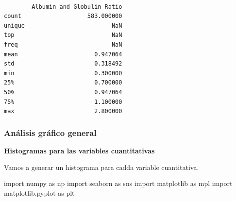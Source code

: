 \documentclass[
  11pt,
  a4paper,
]{article}
\newenvironment{Shaded}{\begin{snugshade}}{\end{snugshade}}
\newcommand{\ImportTok}[1]{#1}
\newcommand{\NormalTok}[1]{#1}
\begin{document}
\newpage

\begin{verbatim}

        Albumin_and_Globulin_Ratio  
count                   583.000000         
unique                         NaN         
top                            NaN           
freq                           NaN                           
mean                      0.947064
std                       0.318492
min                       0.300000  
25%                       0.700000  
50%                       0.947064  
75%                       1.100000  
max                       2.800000
\end{verbatim}

\newpage

\hypertarget{anuxe1lisis-gruxe1fico-general}{%
\subsubsection{Análisis gráfico
general}\label{anuxe1lisis-gruxe1fico-general}}

\textbf{Histogramas para las variables cuantitativas}

\vspace{0.25cm}

Vamos a generar un histograma para cadda variable cuantitativa.

\begin{Shaded}
\begin{Highlighting}[]
\ImportTok{import}\NormalTok{ numpy }\ImportTok{as}\NormalTok{ np}
\ImportTok{import}\NormalTok{ seaborn }\ImportTok{as}\NormalTok{ sns}
\ImportTok{import}\NormalTok{ matplotlib }\ImportTok{as}\NormalTok{ mpl}
\ImportTok{import}\NormalTok{ matplotlib.pyplot }\ImportTok{as}\NormalTok{ plt}
\end{Highlighting}
\end{Shaded}
\end{document}
